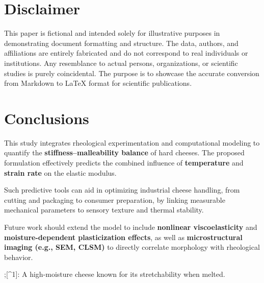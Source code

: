 \documentclass[a4paper,twoside]{article}
\begin{document}
\section{Disclaimer}
This paper is fictional and intended solely for illustrative purposes in demonstrating
document formatting and structure. The data, authors, and affiliations are entirely
fabricated and do not correspond to real individuals or institutions. Any resemblance
to actual persons, organizations, or scientific studies is purely coincidental.
The purpose is to showcase the accurate conversion from Markdown to \LaTeX{} format
for scientific publications.
\section{Conclusions}
This study integrates rheological experimentation and computational modeling to
quantify the \textbf{stiffness--malleability balance} of hard cheeses. The proposed
formulation effectively predicts the combined influence of \textbf{temperature} and
\textbf{strain rate} on the elastic modulus.

Such predictive tools can aid in optimizing industrial cheese handling, from cutting
and packaging to consumer preparation, by linking measurable mechanical parameters to
sensory texture and thermal stability.

Future work should extend the model to include \textbf{nonlinear viscoelasticity} and
\textbf{moisture-dependent plasticization effects}, as well as \textbf{microstructural imaging
(e.g., SEM, CLSM)} to directly correlate morphology with rheological behavior.

;[\^{}1]: A high-moisture cheese known for its stretchability when melted.

\printbibliography
\end{document}
